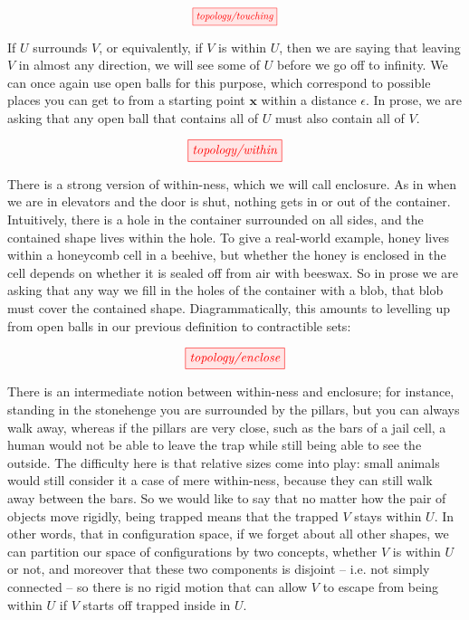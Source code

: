 \begin{fullwidth}
\[\scalebox{0.8}{\tikzfig{topology/touching}}\]


If $U$ surrounds $V$, or equivalently, if $V$ is within $U$, then we are saying that leaving $V$ in almost any direction, we will see some of $U$ before we go off to infinity. We can once again use open balls for this purpose, which correspond to possible places you can get to from a starting point $\mathbf{x}$ within a distance $\epsilon$. In prose, we are asking that any open ball that contains all of $U$ must also contain all of $V$.

\[\tikzfig{topology/within}\]


There is a strong version of within-ness, which we will call enclosure. As in when we are in elevators and the door is shut, nothing gets in or out of the container. Intuitively, there is a hole in the container surrounded on all sides, and the contained shape lives within the hole. To give a real-world example, honey lives within a honeycomb cell in a beehive, but whether the honey is enclosed in the cell depends on whether it is sealed off from air with beeswax. So in prose we are asking that any way we fill in the holes of the container with a blob, that blob must cover the contained shape. Diagrammatically, this amounts to levelling up from open balls in our previous definition to contractible sets:

\[\tikzfig{topology/enclose}\]


There is an intermediate notion between within-ness and enclosure; for instance, standing in the stonehenge you are surrounded by the pillars, but you can always walk away, whereas if the pillars are very close, such as the bars of a jail cell, a human would not be able to leave the trap while still being able to see the outside. The difficulty here is that relative sizes come into play: small animals would still consider it a case of mere within-ness, because they can still walk away between the bars. So we would like to say that no matter how the pair of objects move rigidly, being trapped means that the trapped $V$ stays within $U$. In other words, that in configuration space, if we forget about all other shapes, we can partition our space of configurations by two concepts, whether $V$ is within $U$ or not, and moreover that these two components is disjoint -- i.e. not simply connected -- so there is no rigid motion that can allow $V$ to escape from being within $U$ if $V$ starts off trapped inside in $U$.


\end{fullwidth}
